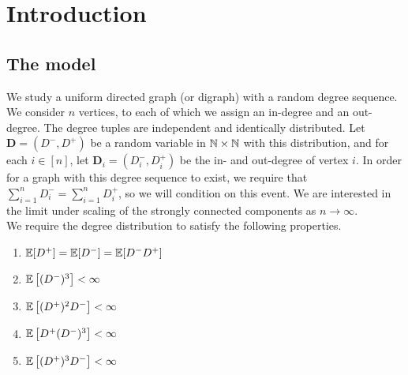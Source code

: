 \section{Introduction}
\subsection{The model}
We study a uniform directed graph (or digraph) with a random degree sequence. We consider $n$ vertices, to each of which we assign an in-degree and an out-degree. The degree tuples are independent and identically distributed. Let $\mathbf{D}=(D^-,D^+)$ be a random variable in ${\mathbb N}\times {\mathbb N}$ with this distribution, and for each $i\in [n]$, let $\mathbf{D}_i=(D^-_i,D^+_i)$  be the in- and out-degree of vertex $i$. In order for a graph with this degree sequence to exist, we require that $\sum_{i=1}^n D^-_i=\sum_{i=1}^n D^+_i$, so we will condition on this event. We are interested in the limit under scaling of the strongly connected components as $n\to \infty$.  \\

We require the degree distribution to satisfy the following properties. 


\begin{enumerate}
    \item \label{cond.mu}${\mathbb E}[D^+]={\mathbb E}[D^-]={\mathbb E}[D^-D^+]$
     \item \label{cond.gamma}${\mathbb E}\left[(D^-)^3\right]<\infty$
    \item \label{cond.rho} ${\mathbb E}\left[(D^+)^2 D^-\right]<\infty$
      \item \label{cond.iota} ${\mathbb E}\left[D^+(D^-)^3\right]<\infty$
      \item ${\mathbb E}\left[(D^+)^3D^-\right]<\infty$
\end{enumerate}

